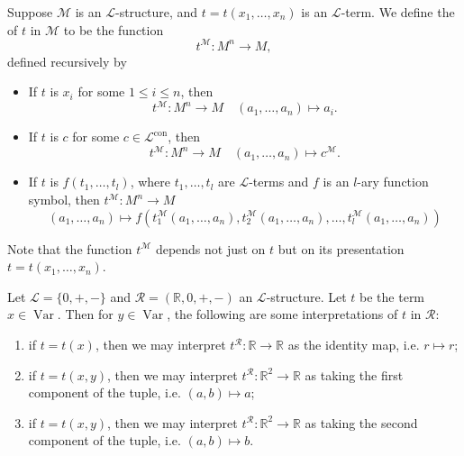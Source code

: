\documentclass[notoc,notitlepage]{tufte-book}
\DeclareMathOperator{\Var}{Var }
\DeclareMathOperator{\con}{con}
\begin{document}
\begin{defn}[Interpretation]\label{defn:interpretation}
  Suppose $\mathcal{M}$ is an $\mathcal{L}$-structure, and $t = t(x_1, \ldots, x_n)$ is an $\mathcal{L}$-term. We define the  of $t$ in $\mathcal{M}$ to be the function
  \begin{equation*}
    t^\mathcal{M} : M^n \to M,
  \end{equation*}
  defined recursively by
  \begin{itemize}
    \item If $t$ is $x_i$ for some $1 \leq i \leq n$, then
      \begin{equation*}
        t^\mathcal{M} : M^n \to M \quad (a_1, \ldots, a_n) \mapsto a_i.
      \end{equation*}
    \item If $t$ is $c$ for some $c \in \mathcal{L}^{\con}$, then
      \begin{equation*}
        t^\mathcal{M} : M^n \to M \quad (a_1, \ldots, a_n) \mapsto c^\mathcal{M}.
      \end{equation*}
    \item If $t$ is $f(t_1, \ldots, t_l)$, where $t_1, \ldots, t_l$ are $\mathcal{L}$-terms and $f$ is an $l$-ary function symbol, then $t^\mathcal{M} : M^n \to M$
      \begin{equation*}
        (a_1, \ldots, a_n) \mapsto f( t_1^\mathcal{M}(a_1, \ldots, a_n), t_2^\mathcal{M}(a_1, \ldots, a_n), \ldots, t_l^\mathcal{M}(a_1, \ldots, a_n) )
      \end{equation*}
  \end{itemize}
\end{defn}

\begin{note}
  Note that the function $t^\mathcal{M}$ depends not just on $t$ but on its presentation $t = t(x_1, \ldots, x_n)$.
\end{note}

\begin{eg}
  Let $\mathcal{L} = \{ 0, +, - \}$ and $\mathcal{R} = (\mathbb{R}, 0, +, -)$ an $\mathcal{L}$-structure. Let $t$ be the term $x \in \Var$. Then for $y \in \Var$, the following are some interpretations of $t$ in $\mathcal{R}$:
  \begin{enumerate}
    \item if $t = t(x)$, then we may interpret $t^\mathcal{R} : \mathbb{R} \to \mathbb{R}$ as the identity map, i.e. $r \mapsto r$;
    \item if $t=  t(x, y)$, then we may interpret $t^\mathcal{R} : \mathbb{R}^2 \to \mathbb{R}$ as taking the first component of the tuple, i.e. $(a, b) \mapsto a$;
    \item if $t = t(x, y)$, then we may interpret $t^\mathcal{R} : \mathbb{R}^2 \to \mathbb{R}$ as taking the second component of the tuple, i.e. $(a, b) \mapsto b$.
  \end{enumerate}
\end{eg}
\end{document}
